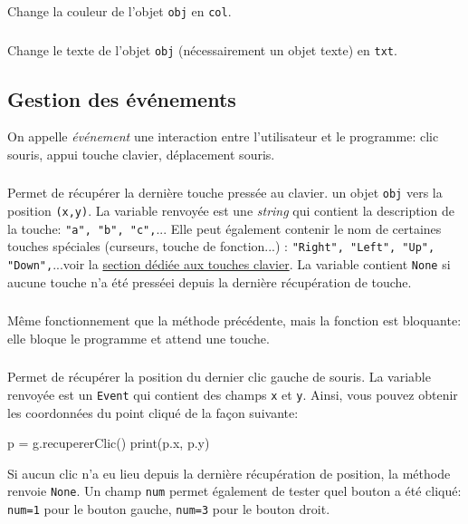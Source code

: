 \documentclass[11pt,a4paper]{article}
\begin{document}
\subsubsection*{}
Change la couleur de l'objet {\tt obj} en {\tt col}.

\subsubsection*{}
Change le texte de l'objet {\tt obj} (nécessairement un objet texte) en {\tt txt}.

\newpage
\subsection*{Gestion des événements}
On appelle {\it événement} une interaction entre l'utilisateur et le programme: clic souris, appui touche clavier, déplacement souris.

\subsubsection*{}
Permet de récupérer la dernière touche pressée au clavier. un objet {\tt obj} vers la position {\tt (x,y)}. La variable renvoyée est une {\it string} qui contient la description de la touche: {\tt "a", "b", "c",}... Elle peut également contenir le nom de certaines touches spéciales (curseurs, touche de fonction...) : {\tt "Right", "Left", "Up", "Down",}...voir la \underline{section dédiée aux touches clavier}. La variable contient {\tt None} si aucune touche n'a été presséei depuis la dernière récupération de touche.

\subsubsection*{}
Même fonctionnement que la méthode précédente, mais la fonction est bloquante: elle bloque le programme et attend une touche.

\subsubsection*{}
Permet de récupérer la position du dernier clic gauche de souris. La variable renvoyée est un {\tt Event} qui contient des champs {\tt x} et {\tt y}. Ainsi, vous pouvez obtenir les coordonnées du point cliqué de la façon suivante:
\begin{ccode}
    p = g.recupererClic()
    print(p.x, p.y)
\end{ccode}
Si aucun clic n'a eu lieu depuis la dernière récupération de position, la méthode renvoie {\tt None}. Un champ {\tt num} permet également de tester quel bouton a été cliqué: {\tt num=1} pour le bouton gauche, {\tt num=3} pour le bouton droit.
\end{document}
